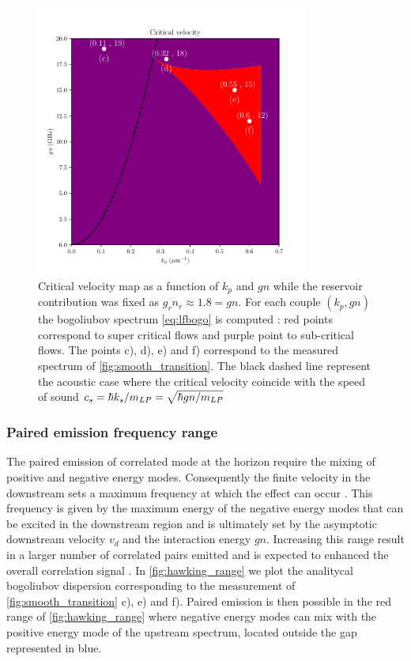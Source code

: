 \begin{figure}
    \centering
    \includegraphics[width=0.8\textwidth]{chap_custom_st/fig/critical_velocity_map.pdf}
    \caption{Critical velocity map as a function of $k_p$ and $gn$ while the reservoir contribution was fixed as $g_rn_r\approx 1.8=gn$. For each couple $(k_p,gn)$ the bogoliubov spectrum \autoref{eq:lfbogo} is computed : red points correspond to super critical flows and purple point to sub-critical flows.
    The points c), d), e) and f) correspond to the measured spectrum of \autoref{fig:smooth_transition}. The black dashed line represent the acoustic case where the critical velocity coincide with the speed of sound $c_s = \hbar k_s/m_{LP}=\sqrt{\hbar gn/m_{LP}}$ }
    \label{fig:critical_velocity_map}
\end{figure}

\subsubsection{Paired emission frequency range}

The paired emission of correlated mode at the horizon require the mixing of positive and negative energy modes. Consequently the finite velocity in the downstream 
sets a maximum frequency at which the effect can occur \cite{jacquet_hawking_2019}. This frequency is given by the maximum energy of the negative energy modes that can be excited in the downstream region and is ultimately 
set by the asymptotic downstream velocity $v_d$ and the interaction energy $gn$. Increasing this range result in a larger number of correlated pairs emitted and is expected to enhanced
the overall correlation signal \cite{jacquet_hawking_2019}. 
In \autoref{fig:hawking_range} we plot the analitycal bogoliubov dispersion corresponding to the measurement of \autoref{fig:smooth_transition} c), e) and f).  Paired emission is then possible in the red range of \autoref{fig:hawking_range}  where negative energy modes
can mix with the positive energy mode of the upstream spectrum, located outside the gap represented in blue.

